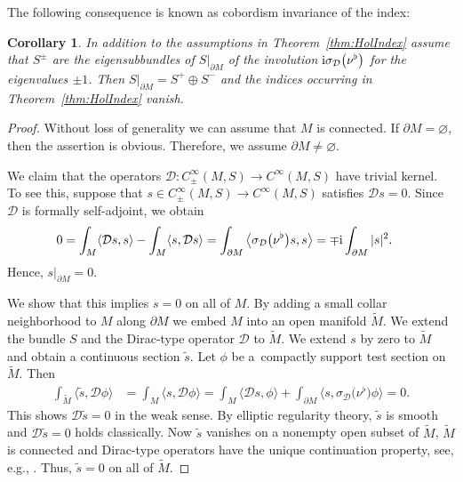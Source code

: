 \documentclass[11pt]{article}
\numberwithin{equation}{section}
\numberwithin{equation}{section}
\newtheorem{Corollary}[Theorem]{Corollary}
\begin{document}
The following consequence is known as cobordism invariance of the index:

\begin{Corollary}\label{cor:CobInv}
In addition to the assumptions in Theorem~{\rm\ref{thm:HolIndex}} assume that $S^\pm$ are the eigensubbundles of $S|_{\partial M}$ of the involution ${\rm i}\sigma_{\mathcal{D}}\big(\nu^\flat\big)$ for the eigenvalues $\pm 1$.
Then $S|_{\partial M} = S^+ \oplus S^-$ and the indices occurring in Theorem~{\rm\ref{thm:HolIndex}} vanish.
\end{Corollary}

\begin{proof}
Without loss of generality we can assume that $M$ is connected.
If $\partial M=\varnothing$, then the assertion is obvious.
Therefore, we assume $\partial M\neq \varnothing$.

We claim that the operators $\mathcal{D}\colon C^\infty_\pm(M,S)\to C^\infty(M,S)$ have trivial kernel.
To see this, suppose that $s\in C^\infty_\pm(M,S)\to C^\infty(M,S)$ satisfies $\mathcal{D}s=0$.
Since $\mathcal{D}$ is formally self-adjoint, we obtain
\begin{align*}
0
&=
\int_M \langle \mathcal{D}s,s\rangle - \int_M \langle s, \mathcal{D}s\rangle
=
\int_{\partial M} \big\langle \sigma_{\mathcal{D}}\big(\nu^\flat\big)s,s\big\rangle
=
\mp {\rm i}\int_{\partial M} |s|^2 .
\end{align*}
Hence, $s|_{\partial M}=0$.

We show that this implies $s=0$ on all of $M$.
By adding a small collar neighborhood to $M$ along $\partial M$ we embed $M$ into an open manifold $\tilde M$.
We extend the bundle $S$ and the Dirac-type operator $\mathcal{D}$ to $\tilde M$.
We extend $s$ by zero to $\tilde M$ and obtain a continuous section $\tilde s$.
Let $\phi$ be a~compactly support test section on $\tilde M$.
Then
\begin{align*}
\int_{\tilde M}\langle \tilde s,\mathcal{D}\phi\rangle
&=
\int_M\langle s,\mathcal{D}\phi\rangle
=
\int_M\langle \mathcal{D}s,\phi\rangle + \int_{\partial M} \big\langle s,\sigma_{\mathcal{D}}\big(\nu^\flat\big)\phi\big\rangle
=
0.
\end{align*}
This shows $\mathcal{D}\tilde s=0$ in the weak sense.
By elliptic regularity theory, $\tilde s$ is smooth and $\mathcal{D}\tilde s=0$ holds classically.
Now $\tilde s$ vanishes on a nonempty open subset of $\tilde M$, $\tilde M$ is connected and Dirac-type operators have the unique continuation property, see, e.g., \cite[Theorem~8.2]{Booss-Wojciechowski}.
Thus, $\tilde s=0$ on all of $\tilde M$.
\end{proof}
\end{document}
